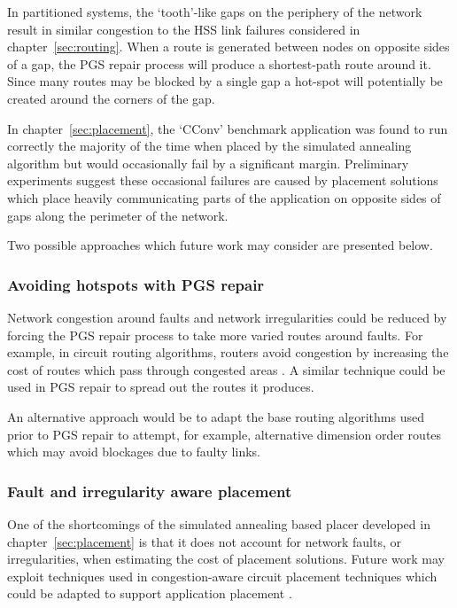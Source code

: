 			In partitioned systems, the `tooth'-like gaps on the periphery of the
			network result in similar congestion to the HSS link failures considered
			in chapter~\ref{sec:routing}. When a route is generated between nodes on
			opposite sides of a gap, the PGS repair process will produce a
			shortest-path route around it. Since many routes may be blocked by a
			single gap a hot-spot will potentially be created around the corners of
			the gap.
			
			In chapter~\ref{sec:placement}, the `CConv' benchmark application was
			found to run correctly the majority of the time when placed by the
			simulated annealing algorithm but would occasionally fail by a
			significant margin. Preliminary experiments suggest these occasional
			failures are caused by placement solutions which place heavily
			communicating parts of the application on opposite sides of gaps along the
			perimeter of the network.
			
			Two possible approaches which future work may consider are presented
			below.
			
			\subsubsection{Avoiding hotspots with PGS repair}
				
				\label{sec:pgs-repair-improvements}	
				
				Network congestion around faults and network irregularities could be
				reduced by forcing the PGS repair process to take more varied routes
				around faults. For example, in circuit routing algorithms, routers
				avoid congestion by increasing the cost of routes which pass through
				congested areas \cite{kahng11}. A similar technique could be used in
				PGS repair to spread out the routes it produces.
				
				An alternative approach would be to adapt the base routing algorithms
				used prior to PGS repair to attempt, for example, alternative dimension
				order routes which may avoid blockages due to faulty links.
			
			\subsubsection{Fault and irregularity aware placement}
				
				One of the shortcomings of the simulated annealing based placer
				developed in chapter~\ref{sec:placement} is that it does not account
				for network faults, or irregularities, when estimating the cost of
				placement solutions.  Future work may exploit techniques used in
				congestion-aware circuit placement techniques which could be adapted to
				support application placement \cite{viswanathan07}.
		
